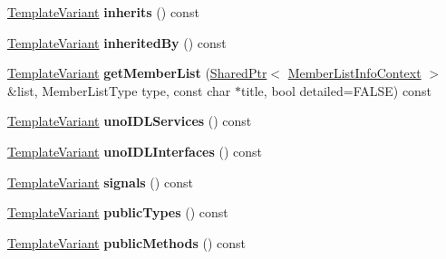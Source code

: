 \begin{DoxyCompactItemize}
\mbox{\hyperlink{class_template_variant}{Template\+Variant}} {\bfseries inherits} () const
\item 
\mbox{\label{class_class_context_1_1_private_a22eabf7eb56106a41082fb3dba55d3b7}} 
\mbox{\hyperlink{class_template_variant}{Template\+Variant}} {\bfseries inherited\+By} () const
\item 
\mbox{\label{class_class_context_1_1_private_a3b32631052aa46583c1b6115fce9a689}} 
\mbox{\hyperlink{class_template_variant}{Template\+Variant}} {\bfseries get\+Member\+List} (\mbox{\hyperlink{class_shared_ptr}{Shared\+Ptr}}$<$ \mbox{\hyperlink{class_member_list_info_context}{Member\+List\+Info\+Context}} $>$ \&list, Member\+List\+Type type, const char $\ast$title, bool detailed=F\+A\+L\+SE) const
\item 
\mbox{\label{class_class_context_1_1_private_a449079bc0c137f68b75494b7b0ab3224}} 
\mbox{\hyperlink{class_template_variant}{Template\+Variant}} {\bfseries uno\+I\+D\+L\+Services} () const
\item 
\mbox{\label{class_class_context_1_1_private_a074f6d972be21d5db85e7f24bae5eb5d}} 
\mbox{\hyperlink{class_template_variant}{Template\+Variant}} {\bfseries uno\+I\+D\+L\+Interfaces} () const
\item 
\mbox{\label{class_class_context_1_1_private_a9a669c78d5afaa25e2a28c93edba8d45}} 
\mbox{\hyperlink{class_template_variant}{Template\+Variant}} {\bfseries signals} () const
\item 
\mbox{\label{class_class_context_1_1_private_ab1a70236d9e5f27a745d8ed92bee8c01}} 
\mbox{\hyperlink{class_template_variant}{Template\+Variant}} {\bfseries public\+Types} () const
\item 
\mbox{\label{class_class_context_1_1_private_a61f3f1269da296ecf98b02b22bb063c5}} 
\mbox{\hyperlink{class_template_variant}{Template\+Variant}} {\bfseries public\+Methods} () const
\item 
\mbox{\label{class_class_context_1_1_private_ab7eb81604f576f8e8383d6fb97de5475}} 

\end{DoxyCompactItemize}
